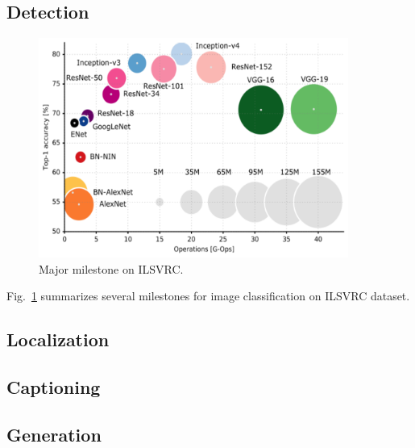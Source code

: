 \subsection{Detection}

\begin{figure}[t]
	\begin{center}
		\includegraphics[width=4in]{figs/detection.pdf}
	\end{center}
	\caption{Major milestone on ILSVRC.}
	\label{fig:detection}
\end{figure}


Fig.~\ref{fig:detection} summarizes several milestones for image classification on ILSVRC dataset. 

\subsection{Localization}


\subsection{Captioning}


\subsection{Generation}









